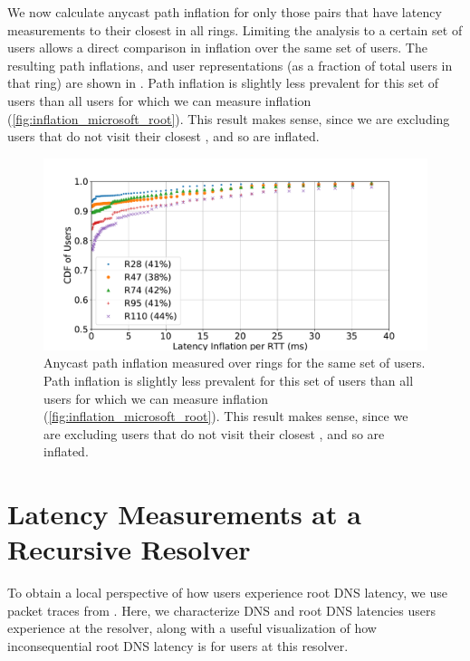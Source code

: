 \documentclass[sigconf,letterpaper,nonacm,10pt,anonymous]{acmart}
\begin{document}
We now calculate anycast path inflation for only those \metroas pairs
that have latency measurements to their closest \fe in all rings.
Limiting the analysis to a certain set of users allows a direct
comparison in inflation over the same set of users. The resulting path
inflations, and user representations (as a fraction of total users in
that ring) are shown in . Path
inflation is slightly less prevalent for this set of users than all
users for which we can measure inflation
(\cref{fig:inflation_microsoft_root}). This result makes sense, since we
are excluding users that do not visit their closest \fe, and so are
inflated.

\begin{figure}
    \centering
    \includegraphics[width=\linewidth]{figures/inflation_microsoft_same_users.pdf}
    \caption{Anycast path inflation measured over rings for the same set of users. Path inflation is slightly less prevalent for this set of users than all users for which we can measure inflation (\cref{fig:inflation_microsoft_root}). This result makes sense, since we are excluding users that do not visit their closest \fe, and so are inflated.}
    \label{fig:inflation_microsoft_same_users}
\end{figure}

\section{Latency Measurements at a Recursive
Resolver}\label{latency-measurements-at-a-recursive-resolver-1}

\label{ap:latency_measurements_isi}

To obtain a local perspective of how users experience root DNS latency,
we use packet traces from \ISIone. Here, we characterize DNS and root
DNS latencies users experience at the resolver, along with a useful
visualization of how inconsequential root DNS latency is for users at
this resolver.
\end{document}
